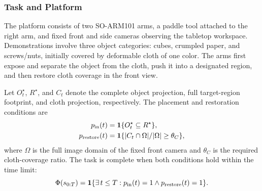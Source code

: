 \subsubsection{Task and Platform}
The platform consists of two SO-ARM101 arms, a paddle tool attached to the right arm, and fixed front and side cameras observing the tabletop workspace.
Demonstrations involve three object categories: cubes, crumpled paper, and screws/nuts, initially covered by deformable cloth of one color.
The arms first expose and separate the object from the cloth, push it into a designated region, and then restore cloth coverage in the front view.

Let $O_t^\star$, $R^\star$, and $C_t$ denote the complete object projection, full target-region footprint, and cloth projection, respectively.
The placement and restoration conditions are
\begin{equation}
 \begin{aligned}
 p_{\mathrm{in}}(t)&=\mathbf 1\{O_t^\star\subseteq R^\star\},\\
 p_{\mathrm{restore}}(t)&=
 \mathbf 1\{|C_t\cap\Omega|/|\Omega|\ge\theta_C\},
 \end{aligned}
 \label{eq:taskpredicates}
\end{equation}
where $\Omega$ is the full image domain of the fixed front camera and $\theta_C$ is the required cloth-coverage ratio.
The task is complete when both conditions hold within the time limit:
\begin{equation}
 \Phi(s_{0:T})=
 \mathbf 1\{\exists\,t\le T:
 p_{\mathrm{in}}(t)=1\land p_{\mathrm{restore}}(t)=1\}.
 \label{eq:completiontask}
\end{equation}
